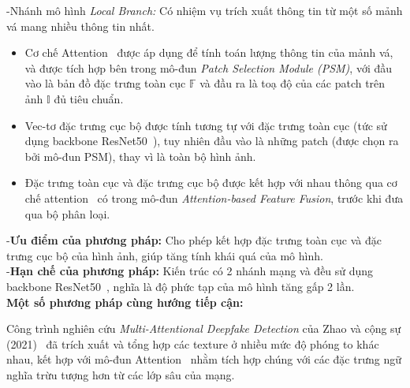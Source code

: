 -Nhánh mô hình \textit{Local Branch:} Có nhiệm vụ trích xuất thông tin từ một số mảnh vá mang nhiều thông tin nhất.

\begin{itemize}
	\item Cơ chế Attention~\cite{Vaswani2017AttentionIA} được áp dụng để tính toán lượng thông tin của mảnh vá, và được tích hợp bên trong mô-đun \textit{Patch Selection Module (PSM)}, với đầu vào là bản đồ đặc trưng toàn cục $\mathbb{F}$ và đầu ra là toạ độ của các \gls{patch} trên ảnh $\mathbb{I}$ đủ tiêu chuẩn.
	\item Vec-tơ đặc trưng cục bộ được tính tương tự với đặc trưng toàn cục (tức sử dụng \gls{backbone} ResNet50~\cite{He2015DeepRL}), tuy nhiên đầu vào là những \gls{patch} (được chọn ra bởi mô-đun PSM), thay vì là toàn bộ hình ảnh.
	\item Đặc trưng toàn cục và đặc trưng cục bộ được kết hợp với nhau thông qua cơ chế \gls{attention}~\cite{Vaswani2017AttentionIA} có trong mô-đun \textit{Attention-based Feature Fusion}, trước khi đưa qua bộ phân loại.
\end{itemize}
%
-\textbf{Ưu điểm của phương pháp:}
%
Cho phép kết hợp đặc trưng toàn cục và đặc trưng cục bộ của hình ảnh, giúp tăng tính khái quá của mô hình.\\
%
-\textbf{Hạn chế của phương pháp:}
Kiến trúc có 2 nhánh mạng và đều sử dụng \gls{backbone} ResNet50~\cite{He2015DeepRL}, nghĩa là độ phức tạp của mô hình tăng gấp 2 lần.\\
%
\textbf{Một số phương pháp cùng hướng tiếp cận:}
%

Công trình nghiên cứu \textit{Multi-Attentional Deepfake Detection} của Zhao và cộng sự (2021)~\cite{Zhao_2021_CVPR} đã trích xuất và tổng hợp các \gls{texture} ở nhiều mức độ phóng to khác nhau, kết hợp với mô-đun Attention~\cite{Vaswani2017AttentionIA} nhằm tích hợp chúng với các đặc trưng ngữ nghĩa trừu tượng hơn từ các lớp sâu của mạng.

